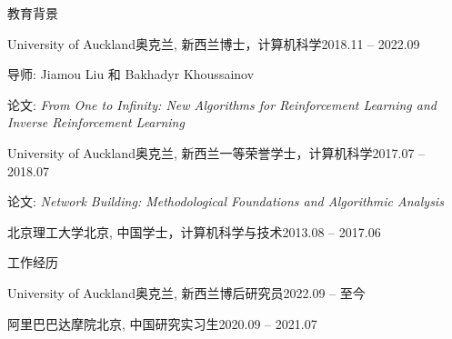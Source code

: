 \documentclass{resume} %
\begin{document}

\begin{rSection}{教育背景}

\begin{rSubsection}{University of Auckland}{奥克兰, 新西兰}{博士，计算机科学}{2018.11 -- 2022.09}%
\item 导师: Jiamou Liu 和 Bakhadyr Khoussainov
\item 论文: {\em From One to Infinity: New Algorithms for Reinforcement Learning and Inverse Reinforcement Learning}
\end{rSubsection}

\begin{rSubsection}{University of Auckland}{奥克兰, 新西兰}{一等荣誉学士，计算机科学}{2017.07 -- 2018.07}
\item 论文: {\em Network Building: Methodological Foundations and Algorithmic Analysis}
\end{rSubsection}

\begin{rSubsection}{北京理工大学}{北京, 中国}{学士，计算机科学与技术}{2013.08 -- 2017.06}
\end{rSubsection}
\end{rSection}


\begin{rSection}{工作经历}
\begin{rSubsection}{University of Auckland}{奥克兰, 新西兰}{博后研究员}{2022.09 -- 至今}
\end{rSubsection}
	\begin{rSubsection}{阿里巴巴达摩院}{北京, 中国}{研究实习生}{2020.09 -- 2021.07}
\end{rSubsection}
\end{rSection}
\end{document}
